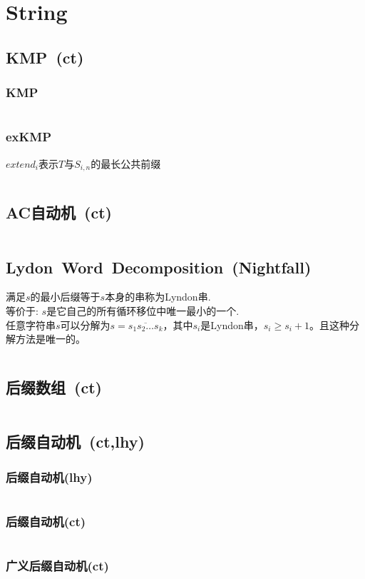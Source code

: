 \chapter{String}
\section{KMP\ \small(ct)}
	\subsection*{KMP}
		\inputminted{cpp}{string/kmp.cpp}
	\subsection*{exKMP}
		$ extend_i $表示$ T $与$ S_{i,n} $的最长公共前缀
		\inputminted{cpp}{string/ex_kmp.cpp}
\section{AC自动机\ \small(ct)}
	\inputminted{cpp}{string/ac_automaton.cpp}
\section{Lydon\ Word\ Decomposition\ \small(Nightfall)}
	满足$ s $的最小后缀等于$ s $本身的串称为Lyndon串.
	\\等价于: $ s $是它自己的所有循环移位中唯一最小的一个.
	\\任意字符串$ s $可以分解为$ s = \overline{s_1 s_2 \dots s_k} $，其中$ s_i $是Lyndon串，$ s_i \geq s_i + 1 $。且这种分解方法是唯一的。
	\inputminted{cpp}{string/lydon.cpp}
\section{后缀数组\ \small(ct)}
	\inputminted{cpp}{string/suffix_array.cpp}
\section{后缀自动机\ \small(ct,lhy)}
	\subsection*{后缀自动机(lhy)}
		\inputminted{cpp}{string/suffix_automaton_lhy.cpp}
	\subsection*{后缀自动机(ct)}
		\inputminted{cpp}{string/suffix_automaton.cpp}
	\subsection*{广义后缀自动机(ct)}
		\inputminted{cpp}{string/general_suffix_automaton.cpp}
